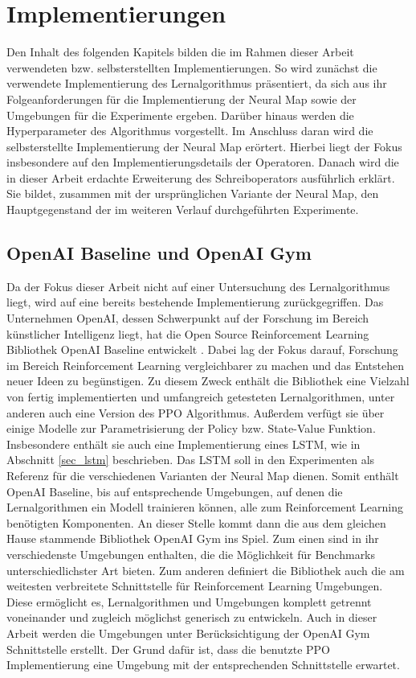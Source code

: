 \chapter{Implementierungen}
\label{chap_impl}

Den Inhalt des folgenden Kapitels bilden die im Rahmen dieser Arbeit verwendeten bzw. selbsterstellten Implementierungen. So wird zunächst die verwendete Implementierung des Lernalgorithmus präsentiert, da sich aus ihr Folgeanforderungen für die Implementierung der Neural Map sowie der Umgebungen für die Experimente ergeben. Darüber hinaus werden die Hyperparameter des Algorithmus vorgestellt. Im Anschluss daran wird die selbsterstellte Implementierung der Neural Map erörtert. Hierbei liegt der Fokus insbesondere auf den Implementierungsdetails der Operatoren. Danach wird die in dieser Arbeit erdachte Erweiterung des Schreiboperators ausführlich erklärt. Sie bildet, zusammen mit der ursprünglichen Variante der Neural Map, den Hauptgegenstand der im weiteren Verlauf durchgeführten Experimente.


\section{OpenAI Baseline und OpenAI Gym}
\label{ppo_impl}

Da der Fokus dieser Arbeit nicht auf einer Untersuchung des Lernalgorithmus liegt, wird auf eine bereits bestehende Implementierung zurückgegriffen. Das Unternehmen OpenAI, dessen Schwerpunkt auf der Forschung im Bereich künstlicher Intelligenz liegt, hat die Open Source Reinforcement Learning Bibliothek OpenAI Baseline entwickelt \cite{Baselines}. Dabei lag der Fokus darauf, Forschung im Bereich Reinforcement Learning vergleichbarer zu machen und das Entstehen neuer Ideen zu begünstigen. Zu diesem Zweck enthält die Bibliothek eine Vielzahl von fertig implementierten und umfangreich getesteten Lernalgorithmen, unter anderen auch eine Version des PPO Algorithmus. Außerdem verfügt sie über einige Modelle zur Parametrisierung der Policy bzw. State-Value Funktion. Insbesondere enthält sie auch eine Implementierung eines LSTM, wie in Abschnitt \ref{sec_lstm} beschrieben. Das LSTM soll in den Experimenten als Referenz für die verschiedenen Varianten der Neural Map dienen. Somit enthält OpenAI Baseline, bis auf entsprechende Umgebungen, auf denen die Lernalgorithmen ein Modell trainieren können, alle zum Reinforcement Learning benötigten Komponenten. An dieser Stelle kommt dann die aus dem gleichen Hause stammende Bibliothek OpenAI Gym ins Spiel. Zum einen sind in ihr verschiedenste Umgebungen enthalten, die die Möglichkeit für Benchmarks unterschiedlichster Art bieten. Zum anderen definiert die Bibliothek auch die am weitesten verbreitete Schnittstelle für Reinforcement Learning Umgebungen. Diese ermöglicht es, Lernalgorithmen und Umgebungen komplett getrennt voneinander und zugleich möglichst generisch zu entwickeln. Auch in dieser Arbeit werden die Umgebungen unter Berücksichtigung der OpenAI Gym Schnittstelle erstellt. Der Grund dafür ist, dass die benutzte PPO Implementierung eine Umgebung mit der entsprechenden Schnittstelle erwartet.


